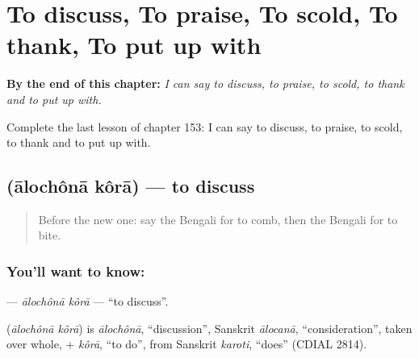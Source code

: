 
\chapter{To discuss, To praise, To scold, To thank, To put up with}
\label{ch:bn-to-discuss-to-praise-to-scold-to-thank-to-put-up-with}

\begin{chapteropening}
\textbf{By the end of this chapter:} \emph{I can say to discuss, to praise, to scold, to thank and to put up with.}

Complete the last lesson of chapter 153: I can say to discuss, to praise, to scold, to thank and to put up with.
\end{chapteropening}

\section[\texorpdfstring{\bn{আলোচনা} \bn{করা} (ālochônā kôrā)}{আলোচনা করা (ālochônā kôrā)}]{  (ālochônā kôrā) — to discuss}

\label{lesson:BN-C153-alochona-kora}



\begin{quote}
Before the new one: say the Bengali for to comb, then the Bengali for to bite.
\end{quote}

\subsection*{You'll want to know:  }
\textbf{ } — \emph{ālochônā kôrā} — \textquotedblleft{}to discuss\textquotedblright{}.

\begin{cousinweb}
\textbf{ } (\emph{ālochônā kôrā}) is \emph{ālochônā}, \textquotedblleft{}discussion\textquotedblright{}, Sanskrit \emph{ālocanā}, \textquotedblleft{}consideration\textquotedblright{}, taken over whole, + \emph{kôrā}, \textquotedblleft{}to do\textquotedblright{}, from Sanskrit \emph{karoti}, \textquotedblleft{}does\textquotedblright{} (CDIAL 2814).
\end{cousinweb}

